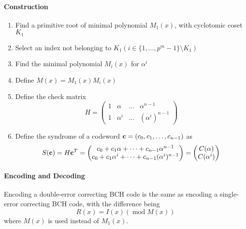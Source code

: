 \paragraph{Construction}
\begin{enumerate}
    \item Find a primitive root of minimal polynomial \(M_1(x)\), with cyclotomic coset \(K_1\)
    \item Select an index not belonging to \(K_1 (i \in \{1, \dots, p^m - 1\} \setminus K_1)\)
    \item Find the minimal polynomial \(M_i(x)\) for \(\alpha^i\)
    \item Define \(M(x) = M_1(x) M_i(x)\)
    \item Define the check matrix
          \[H = \begin{pmatrix}
                  1 & \alpha   & \dots & \alpha^{n - 1}     \\
                  1 & \alpha^i & \dots & (\alpha^i)^{n - 1}
              \end{pmatrix}\]
    \item Define the syndrome of a codeword \(\mathbf{c} = (c_0, c_1, \dots, c_{n - 1})\) as
          \[S(\mathbf{c}) = H\mathbf{c}^T = \begin{pmatrix}
                  c_0 + c_1\alpha + \dots + c_{n - 1}\alpha^{n - 1} \\
                  c_0 + c_1 \alpha^i + \dots + c_{n - 1}(\alpha^i)^{n - 1}
              \end{pmatrix} = \begin{pmatrix}
                  C(\alpha) \\
                  C(\alpha^i)
              \end{pmatrix}\]
\end{enumerate}

\paragraph{Encoding and Decoding}
Encoding a double-error correcting BCH code is the same as encoding a single-error correcting BCH code, with the difference being
\[R(x) = I(x)(\operatorname{mod} M(x))\]
where \(M(x)\) is used instead of \(M_1(x)\).

